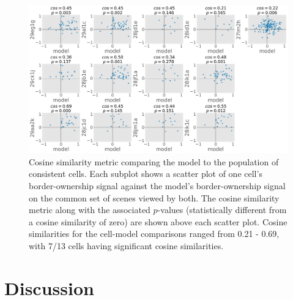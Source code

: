 \begin{figure}[t!]
\centering
\includegraphics[width=\textwidth]{NaturalImage/figs/cell_model_cos_p}
\makeatletter
\let\@currsize\normalsize
\caption[Cosine similarity between model and cell responses]{Cosine similarity metric comparing the model to the population of consistent cells. Each subplot shows a scatter plot of one cell's border-ownership signal against the model's border-ownership signal on the common set of scenes viewed by both. The cosine similarity metric along with the associated $p$-values (statistically different from a cosine similarity of zero) are shown above each scatter plot. Cosine similarities for the cell-model comparisons ranged from 0.21 - 0.69, with 7/13 cells having significant cosine similarities.}
\label{Fig:cell_model_cos}
\end{figure}

\section{Discussion}
\label{sec:discussion}


%

